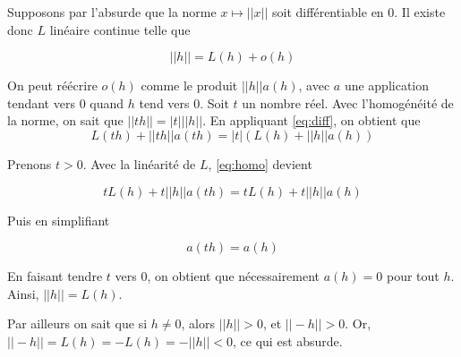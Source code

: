 \documentclass[
10pt, %
a4paper, %
oneside, %
headinclude,footinclude, %
BCOR5mm, %
]{scrartcl}
\begin{document}
Supposons par l'absurde que la norme $x\mapsto ||x||$ soit différentiable en $0$. Il existe donc $L$ linéaire continue telle que

\begin{equation}
    \label{eq:diff}
    ||h|| = L(h) + o(h)
\end{equation}

On peut réécrire $o(h)$ comme le produit $||h||a(h)$, avec $a$ une application tendant vers $0$ quand $h$ tend vers $0$. Soit $t$ un nombre réel. Avec l'homogénéité de la norme, on sait que $||th||=|t|||h||$. En appliquant \ref{eq:diff}, on obtient que
\begin{equation}
    \label{eq:homo}
    L(th) + ||th||a(th) = |t| (L(h) + ||h||a(h))
\end{equation}

Prenons $t>0$. Avec la linéarité de $L$, \ref{eq:homo} devient

\begin{equation}
    tL(h) + t||h||a(th) = t L(h) + t||h||a(h)
\end{equation}

Puis en simplifiant

\begin{equation}
    a(th) = a(h)
\end{equation}

En faisant tendre $t$ vers 0, on obtient que nécessairement $a(h)=0$ pour tout $h$. Ainsi, $||h||=L(h)$.

Par ailleurs on sait que si $h\neq 0$, alors $||h||>0$, et $||-h||>0$. Or, $||-h|| = L(h) = -L(h) = -||h||<0$, ce qui est absurde.
\end{document}
